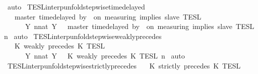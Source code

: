 \begin{isabellebody}
%
\isadelimproof
%
\endisadelimproof
%
\isatagproof
{}\isamarkupfalse%
\ auto%
\endisatagproof
{\isafoldproof}%
%
\isadelimproof
\isanewline
%
\endisadelimproof
\isanewline
{}\isamarkupfalse%
\ TESL{\isacharunderscore}interp{\isacharunderscore}unfold{\isacharunderscore}stepwise{\isacharunderscore}timedelayed{\isacharcolon}\isanewline
\ \ {\isacartoucheopen}{\isasymlbrakk}\ master\ time{\isacharminus}delayed\ by\ {\isasymdelta}{\isasymtau}\ on\ measuring\ implies\ slave\ {\isasymrbrakk}\isactrlsub T\isactrlsub E\isactrlsub S\isactrlsub L\isanewline
\ \ \ \ {\isacharequal}\ {\isasymInter}\ {\isacharbraceleft}Y{\isachardot}\ {\isasymexists}n{\isacharcolon}{\isacharcolon}nat{\isachardot}\ Y\ {\isacharequal}\ {\isasymlbrakk}\ master\ time{\isacharminus}delayed\ by\ {\isasymdelta}{\isasymtau}\ on\ measuring\ implies\ slave\ {\isasymrbrakk}\isactrlsub T\isactrlsub E\isactrlsub S\isactrlsub L\isactrlbsup {\isasymge}\ n\isactrlesup {\isacharbraceright}{\isacartoucheclose}\isanewline
%
\isadelimproof
%
\endisadelimproof
%
\isatagproof
{}\isamarkupfalse%
\ auto%
\endisatagproof
{\isafoldproof}%
%
\isadelimproof
\isanewline
%
\endisadelimproof
\isanewline
{}\isamarkupfalse%
\ TESL{\isacharunderscore}interp{\isacharunderscore}unfold{\isacharunderscore}stepwise{\isacharunderscore}weakly{\isacharunderscore}precedes{\isacharcolon}\isanewline
\ \ {\isacartoucheopen}{\isasymlbrakk}\ K\ weakly\ precedes\ K\ {\isasymrbrakk}\isactrlsub T\isactrlsub E\isactrlsub S\isactrlsub L\isanewline
\ \ \ \ {\isacharequal}\ {\isasymInter}\ {\isacharbraceleft}Y{\isachardot}\ {\isasymexists}n{\isacharcolon}{\isacharcolon}nat{\isachardot}\ Y\ {\isacharequal}\ {\isasymlbrakk}\ K\ weakly\ precedes\ K\ {\isasymrbrakk}\isactrlsub T\isactrlsub E\isactrlsub S\isactrlsub L\isactrlbsup {\isasymge}\ n\isactrlesup {\isacharbraceright}{\isacartoucheclose}\isanewline
%
\isadelimproof
%
\endisadelimproof
%
\isatagproof
{}\isamarkupfalse%
\ auto%
\endisatagproof
{\isafoldproof}%
%
\isadelimproof
\isanewline
%
\endisadelimproof
\isanewline
{}\isamarkupfalse%
\ TESL{\isacharunderscore}interp{\isacharunderscore}unfold{\isacharunderscore}stepwise{\isacharunderscore}strictly{\isacharunderscore}precedes{\isacharcolon}\isanewline
\ \ {\isacartoucheopen}{\isasymlbrakk}\ K\ strictly\ precedes\ K\ {\isasymrbrakk}\isactrlsub T\isactrlsub E\isactrlsub S\isactrlsub L\isanewline

\end{isabellebody}
